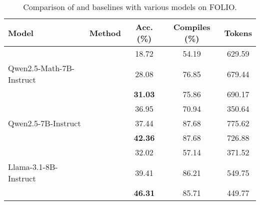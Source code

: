 \begin{table*}[tbh]
\centering
    \caption{Comparison of \Tool{} and baselines with various models on FOLIO.}
    \begin{tabular}{llccc}
        \toprule
        \textbf{Model} & \textbf{Method} & \textbf{Acc. (\%)}  & \textbf{Compiles (\%)} & \textbf{Tokens} \\
\midrule
     & \cotUnconstrained{} & 18.72 & 54.19 & 629.59 \\
 Qwen2.5-Math-7B-Instruct & \stdConstrained{} & 28.08 & 76.85 &  679.44 \\
 & \textbf{\Tool{}} & \textbf{31.03} & 75.86 & 690.17  \\
\midrule

     & \cotUnconstrained{} & 36.95 & 70.94 & 350.64  \\
 Qwen2.5-7B-Instruct & \stdConstrained{} & 37.44 & 87.68 & 775.62 \\
 & \textbf{\Tool{}} & \textbf{42.36} & 87.68 & 726.88  \\

 \midrule
     & \cotUnconstrained{} & 32.02 & 57.14 & 371.52  \\
 Llama-3.1-8B-Instruct & \stdConstrained{} & 39.41 & 86.21 & 549.75  \\
 & \textbf{\Tool{}} & \textbf{46.31} & 85.71 & 449.77  \\


\bottomrule
    \end{tabular}
    \label{tab:fol_comparison}
    \vspace{-.2in}
\end{table*}
